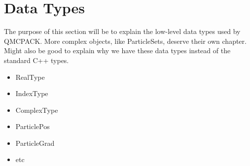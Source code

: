 \section{Data Types}
The purpose of this section will be to explain the low-level data types used by QMCPACK.
More complex objects, like ParticleSets, deserve their own chapter.  Might also be good
to explain why we have these data types instead of the standard C++ types. 
\begin{itemize}
\item RealType
\item IndexType
\item ComplexType
\item ParticlePos
\item ParticleGrad
\item etc 
\end{itemize}
